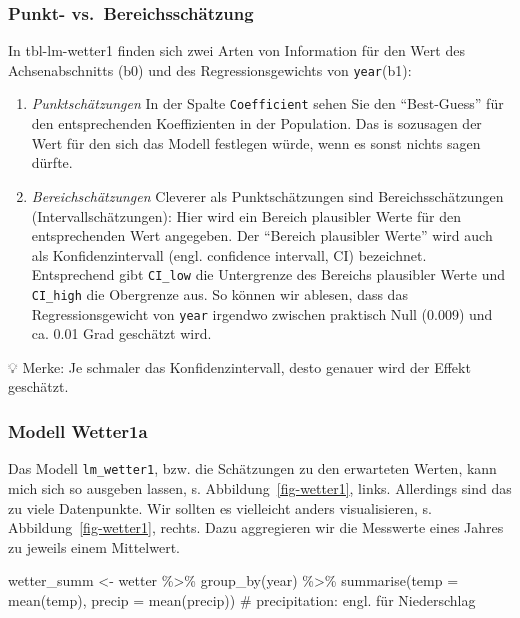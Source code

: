 \documentclass[
  a4paper,
]{scrbook}
\newenvironment{Shaded}{\begin{snugshade}}{\end{snugshade}}
\newcommand{\AttributeTok}[1]{\textcolor[rgb]{0.40,0.45,0.13}{#1}}
\newcommand{\CommentTok}[1]{\textcolor[rgb]{0.37,0.37,0.37}{#1}}
\newcommand{\FunctionTok}[1]{\textcolor[rgb]{0.28,0.35,0.67}{#1}}
\newcommand{\NormalTok}[1]{\textcolor[rgb]{0.00,0.23,0.31}{#1}}
\newcommand{\OtherTok}[1]{\textcolor[rgb]{0.00,0.23,0.31}{#1}}
\newcommand{\SpecialCharTok}[1]{\textcolor[rgb]{0.37,0.37,0.37}{#1}}
\theoremstyle{definition}
\theoremstyle{definition}
\theoremstyle{definition}
\theoremstyle{remark}
\begin{document}
\subsubsection{Punkt-
vs.~Bereichsschätzung}\label{punkt--vs.-bereichsschuxe4tzung}

In tbl-lm-wetter1 finden sich zwei Arten von Information für den Wert
des Achsenabschnitts (b0) und des Regressionsgewichts von
\texttt{year}(b1):

\begin{enumerate}
\def\labelenumi{\arabic{enumi}.}
\item
  \emph{Punktschätzungen} In der Spalte \texttt{Coefficient} sehen Sie
  den ``Best-Guess'' für den entsprechenden Koeffizienten in der
  Population. Das is sozusagen der Wert für den sich das Modell
  festlegen würde, wenn es sonst nichts sagen dürfte.
\item
  \emph{Bereichschätzungen} Cleverer als Punktschätzungen sind
  Bereichsschätzungen (Intervallschätzungen): Hier wird ein Bereich
  plausibler Werte für den entsprechenden Wert angegeben. Der ``Bereich
  plausibler Werte'' wird auch als Konfidenzintervall (engl. confidence
  intervall, CI) bezeichnet. Entsprechend gibt \texttt{CI\_low} die
  Untergrenze des Bereichs plausibler Werte und \texttt{CI\_high} die
  Obergrenze aus. So können wir ablesen, dass das Regressionsgewicht von
  \texttt{year} irgendwo zwischen praktisch Null (0.009) und ca. 0.01
  Grad geschätzt wird.
\end{enumerate}

💡 Merke: Je schmaler das Konfidenzintervall, desto genauer wird der
Effekt geschätzt.

\subsubsection{Modell Wetter1a}\label{modell-wetter1a}

Das Modell \texttt{lm\_wetter1}, bzw. die Schätzungen zu den erwarteten
Werten, kann mich sich so ausgeben lassen, s.
Abbildung~\ref{fig-wetter1}, links. Allerdings sind das zu viele
Datenpunkte. Wir sollten es vielleicht anders visualisieren, s.
Abbildung~\ref{fig-wetter1}, rechts. Dazu aggregieren wir die Messwerte
eines Jahres zu jeweils einem Mittelwert.

\begin{Shaded}
\begin{Highlighting}[]
\NormalTok{wetter\_summ }\OtherTok{\textless{}{-}}
\NormalTok{  wetter }\SpecialCharTok{\%\textgreater{}\%} 
  \FunctionTok{group\_by}\NormalTok{(year) }\SpecialCharTok{\%\textgreater{}\%} 
  \FunctionTok{summarise}\NormalTok{(}\AttributeTok{temp =} \FunctionTok{mean}\NormalTok{(temp),}
            \AttributeTok{precip =} \FunctionTok{mean}\NormalTok{(precip))  }\CommentTok{\# precipitation: engl. für Niederschlag}
\end{Highlighting}
\end{Shaded}
\end{document}
